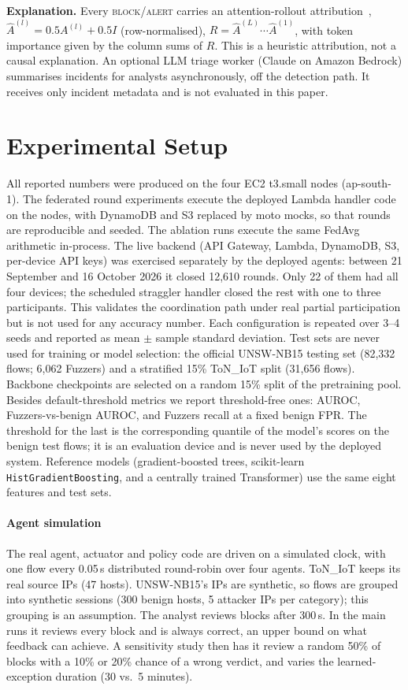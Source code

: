 \textbf{Explanation.} Every \textsc{block}/\textsc{alert} carries an
attention-rollout attribution~\cite{abnar2020},
$\hat A^{(l)} = 0.5A^{(l)}+0.5I$ (row-normalised),
$R=\hat A^{(L)}\cdots\hat A^{(1)}$, with token importance given by the column
sums of $R$. This is a heuristic attribution, not a causal explanation.
An optional LLM triage worker (Claude on Amazon Bedrock) summarises
incidents for analysts asynchronously, off the detection path. It receives
only incident metadata and is not evaluated in this paper.

\section{Experimental Setup}
All reported numbers were produced on the four EC2 t3.small nodes
(ap-south-1). The federated round experiments execute the deployed Lambda
handler code on the nodes, with DynamoDB and S3 replaced by moto mocks, so that
rounds are reproducible and seeded. The ablation runs execute the same FedAvg
arithmetic in-process. The live backend (API Gateway, Lambda, DynamoDB, S3,
per-device API keys) was exercised separately by the deployed agents: between
21 September and 16 October 2026 it closed 12{,}610 rounds. Only 22 of them
had all four devices; the scheduled straggler handler closed the rest with one
to three participants. This validates the coordination path under real
partial participation but is not used for any accuracy number. Each
configuration is repeated over 3--4 seeds and reported as mean $\pm$ sample
standard deviation. Test sets are never used for training or model selection:
the official UNSW-NB15 testing set (82{,}332 flows; 6{,}062 Fuzzers) and a
stratified 15\% ToN\_IoT split (31{,}656 flows). Backbone checkpoints are
selected on a random 15\% split of the pretraining pool. Besides
default-threshold metrics we report threshold-free ones: AUROC, Fuzzers-vs-benign
AUROC, and Fuzzers recall at a fixed benign FPR. The threshold for the last is
the corresponding quantile of the model's scores on the benign test flows; it
is an evaluation device and is never used by the deployed system. Reference
models (gradient-boosted trees, scikit-learn \texttt{HistGradientBoosting}, and
a centrally trained Transformer) use the same eight features and test sets.

\paragraph{Agent simulation} The real agent, actuator and policy code are
driven on a simulated clock, with one flow every 0.05\,s distributed
round-robin over four agents. ToN\_IoT keeps its real source IPs (47 hosts).
UNSW-NB15's IPs are synthetic, so flows are grouped into synthetic sessions
(300 benign hosts, 5 attacker IPs per category); this grouping is an
assumption. The analyst reviews blocks after 300\,s. In the main runs it
reviews every block and is always correct, an upper bound on what feedback can
achieve. A sensitivity study then has it review a random 50\% of blocks with a
10\% or 20\% chance of a wrong verdict, and varies the learned-exception
duration (30 vs.\ 5 minutes).

